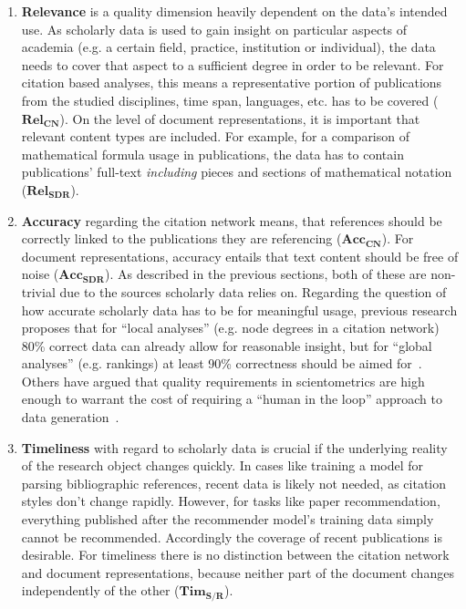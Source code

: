 \begin{enumerate}
    \item \textbf{Relevance} is a quality dimension heavily dependent on the data's intended use. As scholarly data is used to gain insight on particular aspects of academia (e.g. a certain field, practice, institution or individual), the data needs to cover that aspect to a sufficient degree in order to be relevant. For citation based analyses, this means a representative portion of publications from the studied disciplines, time span, languages, etc. has to be covered ($\mathbf{Rel_{CN}}$). On the level of document representations, it is important that relevant content types are included. For example, for a comparison of mathematical formula usage in publications, the data has to contain publications' full-text \emph{including} pieces and sections of mathematical notation ($\mathbf{Rel_{SDR}}$).  %
    \item \textbf{Accuracy} regarding the citation network means, that references should be correctly linked to the publications they are referencing ($\mathbf{Acc_{CN}}$). For document representations, accuracy entails that text content should be free of noise ($\mathbf{Acc_{SDR}}$). As described in the previous sections, both of these are non-trivial due to the sources scholarly data relies on. Regarding the question of how accurate scholarly data has to be for meaningful usage, previous research proposes that for ``local analyses'' (e.g. node degrees in a citation network) 80\% correct data can already allow for reasonable insight, but for ``global analyses'' (e.g. rankings) at least 90\% correctness should be aimed for~\cite{Strotmann2015}. Others have argued that quality requirements in scientometrics are high enough to warrant the cost of requiring a ``human in the loop'' approach to data generation~\cite{Lauscher2018}.  %
    \item \textbf{Timeliness} with regard to scholarly data is crucial if the underlying reality of the research object changes quickly. In cases like training a model for parsing bibliographic references, recent data is likely not needed, as citation styles don't change rapidly.  However, for tasks like paper recommendation, everything published after the recommender model's training data simply cannot be recommended. Accordingly the coverage of recent publications is desirable. For timeliness there is no distinction between the citation network and document representations, because neither part of the document changes independently of the other ($\mathbf{Tim_{S/R}}$). %


\end{enumerate}
